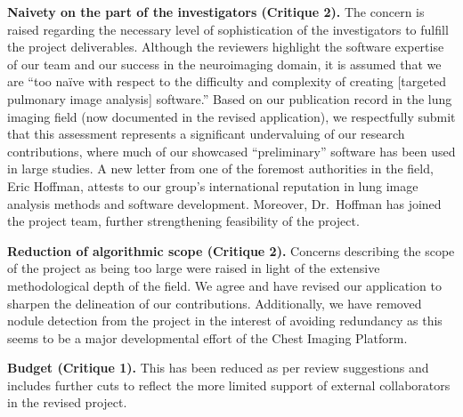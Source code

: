 \documentclass[11pt,]{article}
\begin{document}
\textbf{Naivety on the part of the investigators (Critique 2).} The
concern is raised regarding the necessary level of sophistication of the
investigators to fulfill the project deliverables. Although the
reviewers highlight the software expertise of our team and our success
in the neuroimaging domain, it is assumed that we are ``too naïve with
respect to the difficulty and complexity of creating {[}targeted
pulmonary image analysis{]} software.'' Based on our publication record
in the lung imaging field (now documented in the revised application),
we respectfully submit that this assessment represents a significant
undervaluing of our research contributions, where much of our showcased
``preliminary'' software has been used in large studies. A new letter
from one of the foremost authorities in the field, Eric Hoffman, attests
to our group's international reputation in lung image analysis methods
and software development. Moreover, Dr.~Hoffman has joined the project
team, further strengthening feasibility of the project.

\textbf{Reduction of algorithmic scope (Critique 2).} Concerns
describing the scope of the project as being too large were raised in
light of the extensive methodological depth of the field. We agree and
have revised our application to sharpen the delineation of our
contributions. Additionally, we have removed nodule detection from the
project in the interest of avoiding redundancy as this seems to be a
major developmental effort of the Chest Imaging Platform.

\textbf{Budget (Critique 1).} This has been reduced as per review
suggestions and includes further cuts to reflect the more limited
support of external collaborators in the revised project.

\hypertarget{refs}{}
\end{document}
